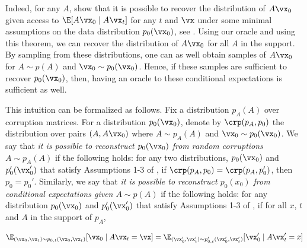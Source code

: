\documentclass{article}
\begin{document}
Indeed, for any $A$, \citet{chen2022sampling} show that it is possible to recover the distribution of $A\vx_0$ given access to $\E[A\vx_0 \mid A\vx_t]$ for any $t$ and $\vx$ under some minimal assumptions on the data distribution $p_0(\vx_0)$, see \cite[Assumptions 1-3]{chen2022sampling}. 
Using our oracle and using this theorem, we can recover the distribution of $A\vx_0$ for all $A$ in the support. By sampling from these distributions, one can as well obtain samples of $A\vx_0$ for $A \sim p(A)$ and $\vx_0 \sim p_0(\vx_0)$. Hence, if these samples are sufficient to recover $p_0(\vx_0)$, then, having an oracle to these conditional expectations is sufficient as well.

This intuition can be formalized as follows. Fix a distribution $p_A(A)$ over corruption matrices. For a distribution $p_0(\vx_0)$, denote by $\crp(p_A, p_0)$ the distribution over pairs $(A,A\vx_0)$ where $A\sim p_A(A)$ and $\vx_0 \sim p_0(\vx_0)$. 
We say that \emph{it is possible to reconstruct $p_0(\vx_0)$ from random corruptions $A \sim p_A(A)$} if the following holds: for any two distributions, $p_0(\vx_0)$ and $p_0'(\vx_0')$ that satisfy Assumptions 1-3 of \citet{chen2022sampling}, if $\crp(p_A,p_0) = \crp(p_A,p_0')$, then $p_0 = p_0'$.
Similarly, we say that \emph{it is possible to reconstruct $p_0(x_0)$ from conditional expectations given $A \sim p(A)$} if the following holds: for any distribution $p_0(\vx_0)$ and $p_0'(\vx_0')$ that satisfy Assumptions 1-3 of \citet{chen2022sampling}, if for all $x$, $t$ and $A$ in the support of $p_A$, 

\begin{equation}\label{eq:rec-cond}
\E_{(\vx_0,\vx_t) \sim p_{0,t}(\vx_0,\vx_t)}[\vx_0 \mid A\vx_t = \vx]
= \E_{(\vx'_0,\vx'_t) \sim p'_{0,t}(\vx_0',\vx_t')}[\vx_0' \mid A\vx_t' = x]
\end{equation}
\end{document}
